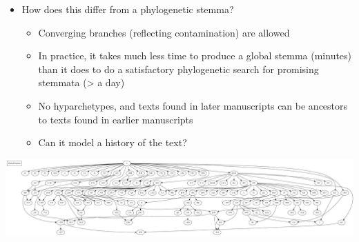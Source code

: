 \documentclass[10pt]{beamer}
\begin{document}
	\begin{frame}
		\begin{itemize}
			\item How does this differ from a phylogenetic stemma?
			\begin{itemize}
				\item Converging branches (reflecting contamination) are allowed
				\item In practice, it takes much less time to produce a global stemma (minutes) than it does to do a satisfactory phylogenetic search for promising stemmata (> a day)
				\item No hyparchetypes, and texts found in later manuscripts can be ancestors to texts found in earlier manuscripts
				\item Can it model a history of the text?
			\end{itemize}
		\end{itemize}
		\begin{center}
			\includegraphics[width=\textwidth]{../img/global-stemma-complete.pdf}
		\end{center}	
	\end{frame}
\end{document}

